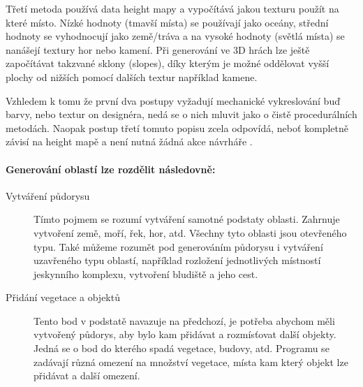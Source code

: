 Třetí metoda používá data height mapy a vypočítává jakou texturu použít na které místo. Nízké hodnoty (tmavší místa) se používají jako oceány, střední hodnoty se vyhodnocují jako země/tráva a na vysoké hodnoty (světlá místa) se nanášejí textury hor nebo kamení. Při generování ve 3D hrách lze ještě započítávat takzvané sklony (slopes), díky kterým je možné oddělovat vyšší plochy od nižších pomocí dalších textur například kamene.

Vzhledem k tomu že první dva postupy vyžadují mechanické vykreslování buď barvy, nebo textur on designéra, nedá se o nich mluvit jako o čistě procedurálních metodách. Naopak postup třetí tomuto popisu zcela odpovídá, neboť kompletně závisí na height mapě a není nutná žádná akce návrháře \cite{madoc59000}.

\pagebreak
\paragraph*{Generování oblastí lze rozdělit následovně:}
\begin{description}
	\item[Vytváření půdorysu] Tímto pojmem se rozumí vytváření samotné podstaty oblasti. Zahrnuje vytvoření země, moří, řek, hor, atd. Všechny tyto oblasti jsou otevřeného typu. Také můžeme rozumět pod generováním půdorysu i vytváření uzavřeného typu oblastí, například rozložení jednotlivých místností jeskynního komplexu, vytvoření bludiště a jeho cest. 
	
	\item[Přidání vegetace a objektů] Tento bod v podstatě navazuje na předchozí, je potřeba abychom měli vytvořený půdorys, aby bylo kam přidávat a rozmísťovat další objekty. Jedná se o bod do kterého spadá vegetace, budovy, atd. Programu se zadávají různá omezení na množství vegetace, místa kam který objekt lze přidávat a další omezení.
\end{description} 

